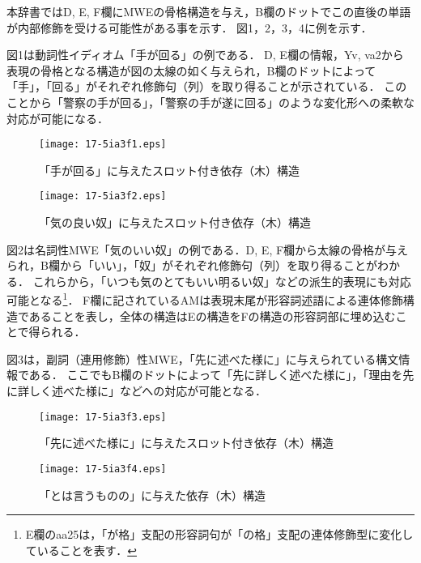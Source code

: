 \documentclass[japanese]{jnlp_1.4}
\begin{document}
本辞書ではD, E, F欄にMWEの骨格構造を与え，B欄のドットでこの直後の単語が内部修飾を受ける可能性がある事を示す．
図1，2，3，4に例を示す．


図1は動詞性イディオム「手が回る」の例である．
D, E欄の情報，Yv, va2から表現の骨格となる構造が図の太線の如く与えられ，B欄のドットによって「手」，「回る」がそれぞれ修飾句（列）を取り得ることが示されている．
このことから「警察の手が回る」，「警察の手が遂に回る」のような変化形への柔軟な対応が可能になる．

\begin{figure}[t]
\begin{center}
\texttt{[image: 17-5ia3f1.eps]}
\end{center}
\caption{「手が回る」に与えたスロット付き依存（木）構造}
\label{fig1}
\end{figure}
\begin{figure}[t]
\begin{center}
\texttt{[image: 17-5ia3f2.eps]}
\end{center}
\caption{「気の良い奴」に与えたスロット付き依存（木）構造}
\label{fig2}
\end{figure}


図2は名詞性MWE「気のいい奴」の例である．D, E, F欄から太線の骨格が与えられ，B欄から「いい」，「奴」がそれぞれ修飾句（列）を取り得ることがわかる．
これらから，「いつも気のとてもいい明るい奴」などの派生的表現にも対応可能となる\footnote{E欄のaa25は，「が格」支配の形容詞句が「の格」支配の連体修飾型に変化していることを表す．}．  F欄に記されているAMは表現末尾が形容詞述語による連体修飾構造であることを表し，全体の構造はEの構造をFの構造の形容詞部に埋め込むことで得られる．

図3は，副詞（連用修飾）性MWE，「先に述べた様に」に与えられている構文情報である．
ここでもB欄のドットによって「先に詳しく述べた様に」，「理由を先に詳しく述べた様に」などへの対応が可能となる．

\begin{figure}[t]
\begin{center}
\texttt{[image: 17-5ia3f3.eps]}
\end{center}
\caption{「先に述べた様に」に与えたスロット付き依存（木）構造}
\label{fig3}
\end{figure}
\begin{figure}[t]
\begin{center}
\texttt{[image: 17-5ia3f4.eps]}
\end{center}
\caption{「とは言うものの」に与えた依存（木）構造}
\label{fig4}
\end{figure}
\end{document}
